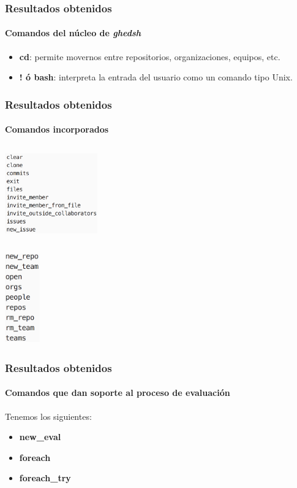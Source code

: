 \documentclass{beamer}
\begin{document}
\begin{frame}
  \frametitle{Resultados obtenidos}
  \framesubtitle{Comandos del núcleo de {\it ghedsh}}

  \begin{itemize}
    \item \textbf{cd}: permite movernos entre repositorios, organizaciones, equipos, etc.
    \item \textbf{! ó bash}: interpreta la entrada del usuario como un comando tipo Unix.
  \end{itemize}

\end{frame}

\begin{frame}
  \frametitle{Resultados obtenidos}
  \framesubtitle{Comandos incorporados}

  \begin{minipage}[t]{0.48\linewidth}
    \centering
    \includegraphics[height=4cm, width=4cm]{img/commands2.png}
  \end{minipage}%
  \begin{minipage}[t]{0.48\linewidth}
    \includegraphics[height=4cm, width=1.5cm]{img/commands1.png}
  \end{minipage}

\end{frame}

\begin{frame}
  \frametitle{Resultados obtenidos}
  \framesubtitle{Comandos que dan soporte al proceso de evaluación}

  Tenemos los siguientes:
    \begin{itemize}
      \item \textbf{new\_eval}
      \item \textbf{foreach}
      \item \textbf{foreach\_try}
    \end{itemize}
\end{frame}
\end{document}
